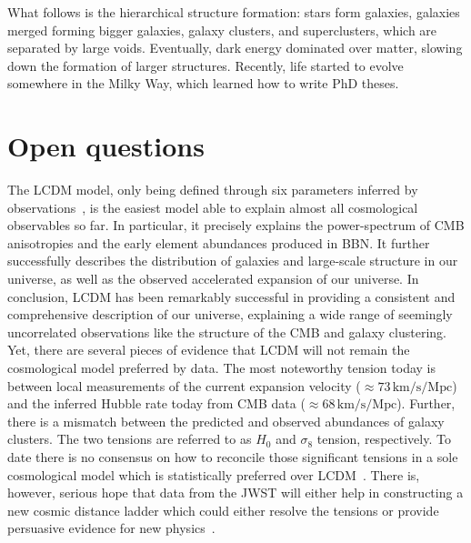 What follows is the hierarchical structure formation: stars form galaxies, galaxies merged forming bigger galaxies, galaxy clusters, and superclusters, which are separated by large  voids. Eventually, dark energy dominated over matter, slowing down the formation of larger structures. Recently, life started to evolve somewhere in the Milky Way, which learned how to write PhD theses.

\section{Open questions} \label{sec:lcdmpuzzles}

The \ac{LCDM} model, only being defined through six parameters inferred by observations~\cite{Planck:2018vyg}, is the easiest model able to explain almost all cosmological observables so far. In particular, it precisely explains the power-spectrum of \ac{CMB} anisotropies and the early element abundances produced in \ac{BBN}. It further successfully describes the distribution of galaxies and large-scale structure in our universe, as well as the observed accelerated expansion of our universe. In conclusion, \ac{LCDM} has been remarkably successful in providing a consistent and comprehensive description of our universe, explaining a wide range of seemingly uncorrelated observations like the structure of the \ac{CMB} and galaxy clustering. Yet, there are  several pieces of evidence that \ac{LCDM} will not remain the cosmological model preferred by data. The most noteworthy tension today is between local measurements of the current expansion velocity ($\approx 73 \, \text{km}/\text{s}/\text{Mpc}$) and the inferred Hubble rate today from \ac{CMB} data ($\approx 68 \, \text{km}/\text{s}/\text{Mpc}$). Further, there is a mismatch between the predicted and observed abundances of galaxy clusters. The two tensions are referred to as $H_0$ and $\sigma_8$ tension, respectively. To date there is no consensus on how to reconcile those significant tensions in a sole cosmological model which is statistically preferred over \ac{LCDM}~\cite{Schoneberg:2021qvd}. There is, however, serious hope that data from the \ac{JWST} will either help in constructing a new cosmic distance ladder which could either resolve the tensions or provide persuasive evidence for new physics~\cite{Freedman:2023jcz, Freedman:2024eph}.

